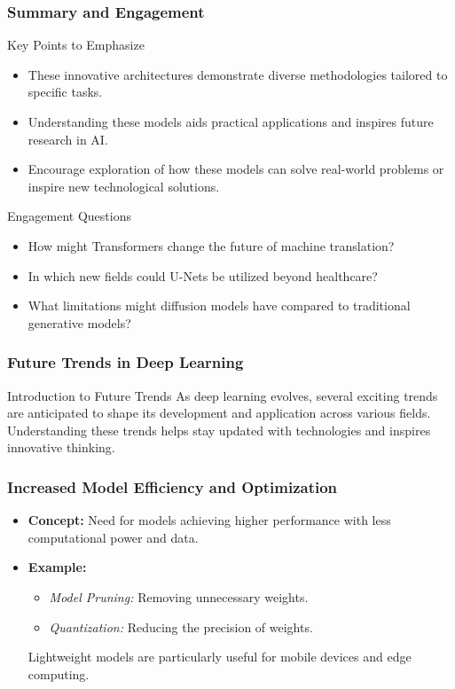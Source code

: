 \documentclass[aspectratio=169]{beamer}
\begin{document}
\begin{frame}[fragile]
    \frametitle{Summary and Engagement}
    \begin{block}{Key Points to Emphasize}
        \begin{itemize}
            \item These innovative architectures demonstrate diverse methodologies tailored to specific tasks.
            \item Understanding these models aids practical applications and inspires future research in AI.
            \item Encourage exploration of how these models can solve real-world problems or inspire new technological solutions.
        \end{itemize}
    \end{block}

    \begin{block}{Engagement Questions}
        \begin{itemize}
            \item How might Transformers change the future of machine translation?
            \item In which new fields could U-Nets be utilized beyond healthcare?
            \item What limitations might diffusion models have compared to traditional generative models?
        \end{itemize}
    \end{block}
\end{frame}

\begin{frame}[fragile]
    \frametitle{Future Trends in Deep Learning}
    \begin{block}{Introduction to Future Trends}
        As deep learning evolves, several exciting trends are anticipated to shape its development and application across various fields. Understanding these trends helps stay updated with technologies and inspires innovative thinking.
    \end{block}
\end{frame}

\begin{frame}[fragile]
    \frametitle{Increased Model Efficiency and Optimization}
    \begin{itemize}
        \item \textbf{Concept:} Need for models achieving higher performance with less computational power and data.
        \item \textbf{Example:} 
            \begin{itemize}
                \item \textit{Model Pruning:} Removing unnecessary weights.
                \item \textit{Quantization:} Reducing the precision of weights.
            \end{itemize}
            Lightweight models are particularly useful for mobile devices and edge computing.
    \end{itemize}
\end{frame}
\end{document}
